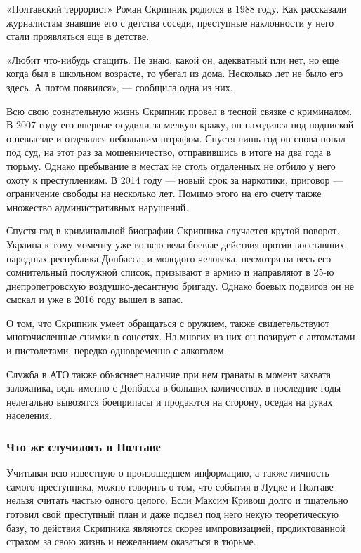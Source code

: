 «Полтавский террорист» Роман Скрипник родился в 1988 году. Как рассказали
журналистам знавшие его с детства соседи, преступные наклонности у него стали
проявляться еще в детстве.

«Любит что-нибудь стащить. Не знаю, какой он, адекватный или нет, но еще когда
был в школьном возрасте, то убегал из дома. Несколько лет не было его здесь. А
потом появился», --- сообщила одна из них.

Всю свою сознательную жизнь Скрипник провел в тесной связке с криминалом. В
2007 году его впервые осудили за мелкую кражу, он находился под подпиской о
невыезде и отделался небольшим штрафом. Спустя лишь год он снова попал под суд,
на этот раз за мошенничество, отправившись в итоге на два года в тюрьму. Однако
пребывание в местах не столь отдаленных не отбило у него охоту к преступлениям.
В 2014 году --- новый срок за наркотики, приговор --- ограничение свободы на
несколько лет. Помимо этого на его счету также множество административных
нарушений.

Спустя год в криминальной биографии Скрипника случается крутой поворот. Украина
к тому моменту уже во всю вела боевые действия против восставших народных
республика Донбасса, и молодого человека, несмотря на весь его сомнительный
послужной список, призывают в армию и направляют в 25-ю днепропетровскую
воздушно-десантную бригаду. Однако боевых подвигов он не сыскал и уже в 2016
году вышел в запас.

О том, что Скрипник умеет обращаться с оружием, также свидетельствуют
многочисленные снимки в соцсетях. На многих из них он позирует с автоматами и
пистолетами, нередко одновременно с алкоголем.

Служба в АТО также объясняет наличие при нем гранаты в момент захвата
заложника, ведь именно с Донбасса в больших количествах в последние годы
нелегально вывозятся боеприпасы и продаются на сторону, оседая на руках
населения.

\subsubsection{Что же случилось в Полтаве}

Учитывая всю известную о произошедшем информацию, а также личность самого
преступника, можно говорить о том, что события в Луцке и Полтаве нельзя считать
частью одного целого. Если Максим Кривош долго и тщательно готовил свой
преступный план и даже подвел под него некую теоретическую базу, то действия
Скрипника являются скорее импровизацией, продиктованной страхом за свою жизнь и
нежеланием оказаться в тюрьме.

